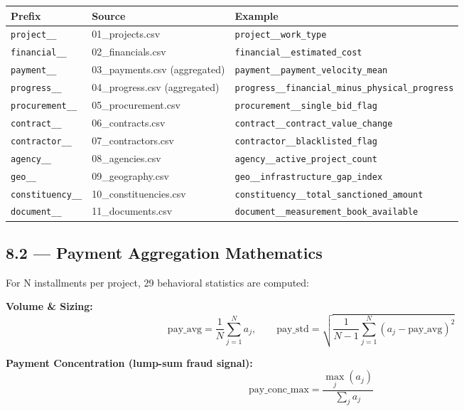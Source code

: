 \documentclass[11pt,a4paper]{article}
\begin{document}
\begin{table}[htbp]
\centering
\small
\begin{tabularx}{\textwidth}{l l Y}
\toprule
\textbf{Prefix} & \textbf{Source} & \textbf{Example} \\
\midrule
\texttt{project\_\_} & 01\_projects.csv & \texttt{project\_\_work\_type} \\
\texttt{financial\_\_} & 02\_financials.csv & \texttt{financial\_\_estimated\_cost} \\
\texttt{payment\_\_} & 03\_payments.csv (aggregated) & \texttt{payment\_\_payment\_velocity\_mean} \\
\texttt{progress\_\_} & 04\_progress.csv (aggregated) & \texttt{progress\_\_financial\_minus\_physical\_progress} \\
\texttt{procurement\_\_} & 05\_procurement.csv & \texttt{procurement\_\_single\_bid\_flag} \\
\texttt{contract\_\_} & 06\_contracts.csv & \texttt{contract\_\_contract\_value\_change} \\
\texttt{contractor\_\_} & 07\_contractors.csv & \texttt{contractor\_\_blacklisted\_flag} \\
\texttt{agency\_\_} & 08\_agencies.csv & \texttt{agency\_\_active\_project\_count} \\
\texttt{geo\_\_} & 09\_geography.csv & \texttt{geo\_\_infrastructure\_gap\_index} \\
\texttt{constituency\_\_} & 10\_constituencies.csv & \texttt{constituency\_\_total\_sanctioned\_amount} \\
\texttt{document\_\_} & 11\_documents.csv & \texttt{document\_\_measurement\_book\_available} \\
\bottomrule
\end{tabularx}
\end{table}


\subsection{8.2 --- Payment Aggregation Mathematics}

For N installments per project, 29 behavioral statistics are computed:

\textbf{Volume \& Sizing:}
\[ \text{pay\_avg} = \frac{1}{N}\sum_{j=1}^{N} a_j, \qquad \text{pay\_std} = \sqrt{\frac{1}{N-1}\sum_{j=1}^{N}(a_j - \text{pay\_avg})^2} \]

\textbf{Payment Concentration (lump-sum fraud signal):}
\[ \text{pay\_conc\_max} = \frac{\max_j(a_j)}{\sum_j a_j} \]
\end{document}
